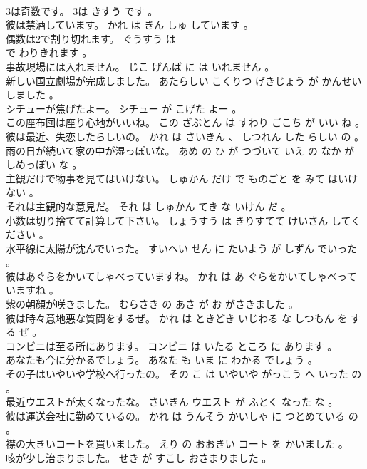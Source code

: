 \documentclass[8pt]{extreport}
\begin{document}
\begin{CJK}{UTF8}{min}
\\	3は奇数です。	3は きすう です 。 
\\	彼は禁酒しています。	かれ は きん しゅ しています 。 
\\	偶数は2で割り切れます。	ぐうすう は 
\\	で わりきれます 。 
\\	事故現場には入れません。	じこ げんば に は いれません 。 
\\	新しい国立劇場が完成しました。	あたらしい こくりつ げきじょう が かんせい しました 。 
\\	シチューが焦げたよー。	シチュー が こげた よー 。 
\\	この座布団は座り心地がいいね。	この ざぶとん は すわり ごこち が いい ね 。 
\\	彼は最近、失恋したらしいの。	かれ は さいきん 、 しつれん した らしい の 。 
\\	雨の日が続いて家の中が湿っぽいな。	あめ の ひ が つづいて いえ の なか が しめっぽい な 。 
\\	主観だけで物事を見てはいけない。	しゅかん だけ で ものごと を みて はいけない 。 
\\	それは主観的な意見だ。	それ は しゅかん てき な いけん だ 。 
\\	小数は切り捨てて計算して下さい。	しょうすう は きりすてて けいさん してください 。 
\\	水平線に太陽が沈んでいった。	すいへい せん に たいよう が しずん でいった 。 
\\	彼はあぐらをかいてしゃべっていますね。	かれ は あ ぐらをかいてしゃべっていますね 。 
\\	紫の朝顔が咲きました。	むらさき の あさ が お がさきました 。 
\\	彼は時々意地悪な質問をするぜ。	かれ は ときどき いじわる な しつもん を する ぜ 。 
\\	コンビニは至る所にあります。	コンビニ は いたる ところ に あります 。 
\\	あなたも今に分かるでしょう。	あなた も いま に わかる でしょう 。 
\\	その子はいやいや学校へ行ったの。	その こ は いやいや がっこう へ いった の 。 
\\	最近ウエストが太くなったな。	さいきん ウエスト が ふとく なった な 。 
\\	彼は運送会社に勤めているの。	かれ は うんそう かいしゃ に つとめている の 。 
\\	襟の大きいコートを買いました。	えり の おおきい コート を かいました 。 
\\	咳が少し治まりました。	せき が すこし おさまりました 。 

\end{CJK}
\end{document}
